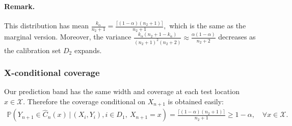 \documentclass{article}
\numberwithin{equation}{section}
\begin{document}
\paragraph{Remark.} This distribution has mean $\frac{k_\alpha}{n_2+1}=\frac{\lceil(1-\alpha)(n_2+1)\rceil}{n_2+1},$ which is the same as the marginal version. Moreover, the variance $\frac{k_\alpha(n_2+1-k_\alpha)}{(n_2+1)^2(n_2+2)}\approx\frac{\alpha(1-\alpha)}{n_2+2}$ decreases as the calibration set $D_2$ expands.

\subsubsection{X-conditional coverage}
Our prediction band has the same width and coverage at each test location $x\in\mathcal{X}.$ Therefore the coverage conditional on $X_{n+1}$ is obtained easily:
\begin{align*}
	\mathbb{P}\left(Y_{n+1}\in\widehat{C}_n(x)\,\big|\,(X_i,Y_i),i\in D_1,\ X_{n+1}=x\right) = \frac{\lceil(1-\alpha)(n_2+1)\rceil}{n_2+1}\geq 1-\alpha,\quad \forall x\in\mathcal{X}.\tag{2.24}
\end{align*}
\end{document}
